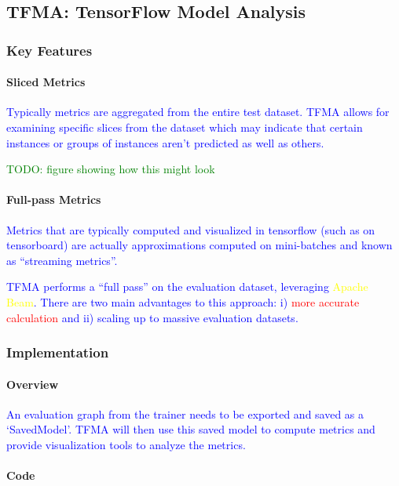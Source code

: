 \subsection{TFMA: TensorFlow Model Analysis}

\subsubsection{Key Features}

\paragraph{Sliced Metrics}

\textcolor{blue}{Typically metrics are aggregated from the entire test dataset. TFMA allows for examining specific slices from the dataset which may indicate that certain instances or groups of instances aren't predicted as well as others.}

\textcolor{green}{TODO: figure showing how this might look}

\paragraph{Full-pass Metrics}

\textcolor{blue}{Metrics that are typically computed and visualized in tensorflow (such as on tensorboard) are actually approximations computed on mini-batches and known as ``streaming metrics''.}

\textcolor{blue}{TFMA performs a ``full pass'' on the evaluation dataset, leveraging \textcolor{yellow}{Apache Beam}. There are two main advantages to this approach: i) \textcolor{red}{more accurate calculation} and ii) scaling up to massive evaluation datasets.}

\subsubsection{Implementation}

\paragraph{Overview}

\textcolor{blue}{An evaluation graph from the trainer needs to be exported and saved as a `SavedModel'. TFMA will then use this saved model to compute metrics and provide visualization tools to analyze the metrics.}

\paragraph{Code}

